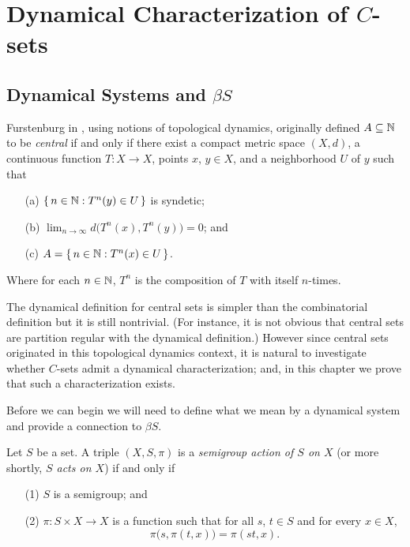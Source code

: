 
\newcommand{\ds}{(X, \la T_s \ra_{s \in S})}
\chapter{Dynamical Characterization of $C$-sets}
\section{Dynamical Systems and $\beta S$}
Furstenburg in \cite[Chapter 8]{Furstenberg:1981fk}, using notions of topological dynamics, originally defined $A \subseteq \mathbb{N}$ to be \emph{central} if and only if there exist a compact metric space $(X, d)$, a continuous function $T \colon X \to X$, points $x$, $y \in X$, and a neighborhood $U$ of $y$ such that
\begin{itemize}
  \item[(a)]
    $\{\, n \in \mathbb{N} : T^n(y) \in U \,\}$ is syndetic;

  \item[(b)]
    $\displaystyle\lim_{n\to\infty} d\bigl(T^n(x), T^n(y) \bigr) = 0$; and

  \item[(c)]
    $A = \{\, n \in \mathbb{N} : T^n(x) \in U \,\}$. 
\end{itemize}
Where for each $n \in \mathbb{N}$, $T^n$ is the composition of $T$ with itself $n$-times.

The dynamical definition for central sets is simpler than the combinatorial definition but it is still nontrivial. 
(For instance, it is not obvious that central sets are partition regular with the dynamical definition.)
However since central sets originated in this topological dynamics context, it is natural to investigate whether $C$-sets admit a dynamical characterization; and, in this chapter we prove that such a characterization exists. 

Before we can begin we will need to define what we mean by a dynamical
system and provide a connection to $\beta S$.
  \begin{defn}
    \label{defn:semiact}
    Let $S$ be a set. 
    A triple $(X, S, \pi)$ is a \textsl{semigroup action of $S$ on
      $X$} (or more shortly, \textsl{$S$ acts on $X$}) if and only if 
      \begin{itemize}
        \item[(1)] $S$ is a semigroup; and
        
        \item[(2)] $\pi : S \times X \to X$ is a function%
 such that
          for all $s$, $t \in S$ and for every $x \in X$,
          \[ \pi\bigl(s, \pi(t,x)\bigr) = \pi(st, x). \]
          
      \end{itemize}
  \end{defn}
  

